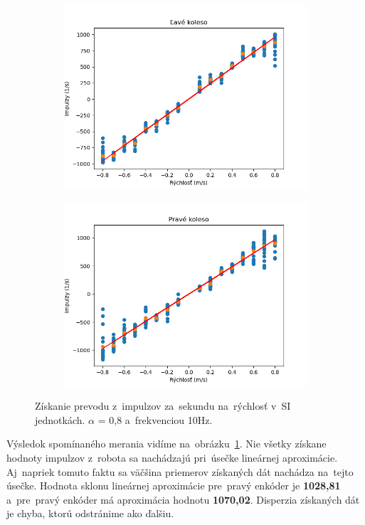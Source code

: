 \clearpage

\begin{figure}[!htbp]
	\begin{subfigure}{0.5\textwidth}
		\includegraphics[width=\textwidth]{img/lw_08100.png}
	\end{subfigure}
	\hfill
	\begin{subfigure}{0.5\textwidth}
		\includegraphics[width=\textwidth]{img/rw_08100.png}
	\end{subfigure}
	\caption{Získanie prevodu z~impulzov za~sekundu na~rýchlosť v~SI jednotkách. $\alpha$ = 0,8 a~frekvenciou 10Hz.}
	\label{fig:rw_lw_08100}
\end{figure}

Výsledok spomínaného merania vidíme na~obrázku~\ref{fig:rw_lw_08100}. Nie všetky získane hodnoty impulzov
z~robota sa nachádzajú pri~úsečke lineárnej aproximácie. Aj~napriek tomuto faktu sa väčšina priemerov získaných
dát nachádza na~tejto úsečke. Hodnota sklonu lineárnej aproximácie pre~pravý enkóder je \textbf{1028,81} a~pre~pravý
enkóder má aproximácia hodnotu \textbf{1070,02}. Disperzia získaných dát je chyba, ktorú odstránime ako ďalšiu.

